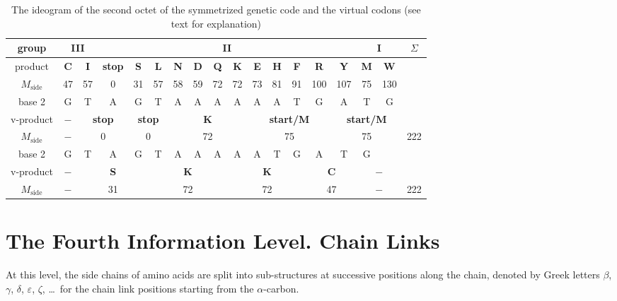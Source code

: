 \documentclass[12pt]{article}
\begin{document}
\begin{table}[htbp]
\centering
\caption{The ideogram of the second octet of the symmetrized genetic code and the virtual codons (see text for explanation)}
\label{tab:virtual_codons}
\footnotesize
\begin{tabular}{|c|c|c|c|c|c|c|c|c|c|c|c|c|c|c|c|c|c|}
\hline
group & \multicolumn{2}{c|}{\textbf{III}} & \multicolumn{12}{c|}{\textbf{II}} & \multicolumn{2}{c|}{\textbf{I}} & $\Sigma$ \\
\hline
product & \textbf{C} & \textbf{I} & \textbf{stop} & \textbf{S} & \textbf{L} & \textbf{N} & \textbf{D} & \textbf{Q} & \textbf{K} & \textbf{E} & \textbf{H} & \textbf{F} & \textbf{R} & \textbf{Y} & \textbf{M} & \textbf{W} & \\
$M_{\text{side}}$ & 47 & 57 & 0 & 31 & 57 & 58 & 59 & 72 & 72 & 73 & 81 & 91 & 100 & 107 & 75 & 130 & \\
\hline
base 2 & G & T & A & G & T & A & A & A & A & A & A & T & G & A & T & G & \\
\hline
v-product & $-$ & \multicolumn{2}{c|}{\textbf{stop}} & \multicolumn{2}{c|}{\textbf{stop}} & \multicolumn{4}{c|}{\textbf{K}} & \multicolumn{4}{c|}{\textbf{start/M}} & \multicolumn{3}{c|}{\textbf{start/M}} & \\
$M_{\text{side}}$ & $-$ & \multicolumn{2}{c|}{0} & \multicolumn{2}{c|}{0} & \multicolumn{4}{c|}{72} & \multicolumn{4}{c|}{75} & \multicolumn{3}{c|}{75} & 222 \\
\hline
base 2 & G & T & A & G & T & A & A & A & A & A & T & G & A & T & G & & \\
v-product & $-$ & \multicolumn{3}{c|}{\textbf{S}} & \multicolumn{4}{c|}{\textbf{K}} & \multicolumn{4}{c|}{\textbf{K}} & \multicolumn{2}{c|}{\textbf{C}} & \multicolumn{2}{c|}{$-$} & \\
$M_{\text{side}}$ & $-$ & \multicolumn{3}{c|}{31} & \multicolumn{4}{c|}{72} & \multicolumn{4}{c|}{72} & \multicolumn{2}{c|}{47} & \multicolumn{2}{c|}{$-$} & 222 \\
\hline
\end{tabular}
\end{table}


\section{The Fourth Information Level. Chain Links}

At this level, the side chains of amino acids are split into sub-structures at successive positions along the chain, denoted by Greek letters $\beta$, $\gamma$, $\delta$, $\varepsilon$, $\zeta$, \ldots\ for the chain link positions starting from the $\alpha$-carbon.
\end{document}
